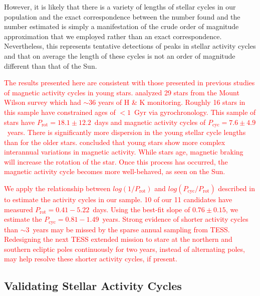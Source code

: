\documentclass[twocolumn, linenumbers]{aastex631}
\begin{document}
However, it is likely that there is a variety of lengths of stellar cycles in our
population and the exact correspondence between the number found and the number
estimated is simply a manifestation of the crude order of magnitude approximation
that we employed rather than an exact correspondence. Nevertheless, this represents
tentative detections of peaks in stellar activity cycles and that on average the
length of these cycles is not an order of magnitude different than that of the Sun.

\textcolor{red}{The results presented here are consistent with those presented in
previous studies of magnetic activity cycles in young stars. \cite{olah16} analyzed
29 stars from the Mount Wilson survey which had $\sim 36$ years of 
H \& K monitoring. Roughly 16 stars in this sample have constrained ages of $< 1$~Gyr
via gyrochronology. This sample of stars have $P_\textrm{rot} = 18.1 \pm 12.2$~days
and magnetic activity cycles of $P_\textrm{cyc} = 7.6 \pm 4.9$~years. There is
significantly more dispersion in the young stellar cycle lengths than for the older
stars. \cite{olah16} concluded that young stars show more complex interannual variations
in magnetic activity. While stars age, magnetic braking will increase the rotation
of the star. Once this process has occurred, the magnetic activity cycle becomes more
well-behaved, as seen on the Sun.}

\textcolor{red}{We apply the relationship between $log(1/P_\textrm{rot})$ and 
$log(P_\textrm{cyc}/P_\textrm{rot})$ described in \cite{olah16} to estimate the
activity cycles in our sample. 10 of our 11 candidates have measured
$P_\textrm{rot} = 0.41 - 5.22$~days. Using the best-fit slope of $0.76 \pm 0.15$,
we estimate the $P_\textrm{cyc} = 0.81 - 1.49$~years. Strong evidence of shorter
activity cycles than $\sim 3$~years may be missed by the sparse annual sampling
from TESS. Redesigning the next TESS extended mission to stare at the northern and
southern ecliptic poles continuously for two years, instead of alternating poles,
may help resolve these shorter activity cycles, if present.}


\subsection{Validating Stellar Activity Cycles}
\end{document}
